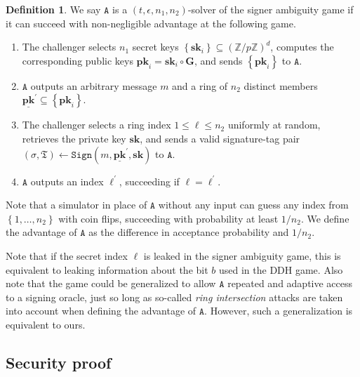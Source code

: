 \documentclass{article}
\theoremstyle{plain}
\theoremstyle{definition}
\newtheorem{defn}{Definition}[section]
\begin{document}
\begin{defn}\label{sigambgame} We say $\texttt{A}$ is a $(t,\epsilon,n_1,n_2)$-solver of the signer ambiguity game if it can succeed with non-negligible advantage at the following game.
\begin{enumerate}
\item The challenger selects $n_1$ secret keys $\left\{\textbf{sk}_i\right\} \subseteq (\mathbb{Z}/p\mathbb{Z})^d$, computes the corresponding public keys $\textbf{pk}_i = \textbf{sk}_i \circ \textbf{G}$, and sends $\left\{\textbf{pk}_i\right\}$ to $\texttt{A}$.

\item $\texttt{A}$ outputs an arbitrary message $m$ and a ring of $n_2$ distinct members $\underline{\textbf{pk}}^\prime \subseteq \left\{\textbf{pk}_i\right\}$.

\item The challenger selects a ring index $1 \leq \ell \leq n_2$ uniformly at random, retrieves the private key $\textbf{sk}$, and sends a valid signature-tag pair $(\sigma, \mathfrak{T}) \leftarrow \texttt{Sign}(m, \underline{\textbf{pk}}^\prime, \textbf{sk})$ to $\texttt{A}$.
\item $\texttt{A}$ outputs an index $\ell^\prime$, succeeding if $\ell = \ell^\prime$. 
\end{enumerate}
Note that a simulator in place of $\texttt{A}$ without any input can guess any index from $\left\{1, \ldots, n_2\right\}$ with coin flips, succeeding with probability  at least $1/n_2$. We define the advantage of $\texttt{A}$ as the difference in acceptance probability and $1/n_2$.
\end{defn}

Note that if the secret index $\ell$ is leaked in the signer ambiguity game, this is equivalent to leaking information about the bit $b$ used in the DDH game. Also note that the game could be generalized to allow $\texttt{A}$ repeated and adaptive access to a signing oracle, just so long as so-called \textit{ring intersection} attacks are taken into account when defining the advantage of $\texttt{A}$. However, such a generalization is equivalent to ours.

\subsection{Security proof}
\end{document}
